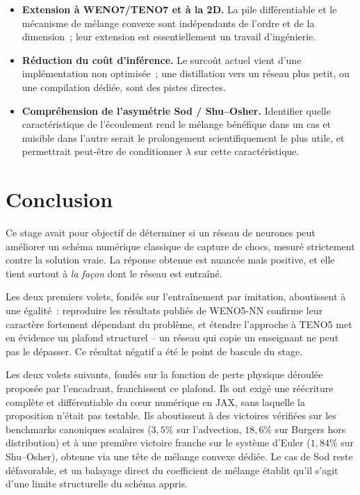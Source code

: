 \documentclass[12pt,a4paper,oneside]{report}
\begin{document}
\begin{itemize}
  \item \textbf{Extension à WENO7/TENO7 et à la 2D.} La pile différentiable et
  le mécanisme de mélange convexe sont indépendants de l'ordre et de la
  dimension~; leur extension est essentiellement un travail d'ingénierie.
  \item \textbf{Réduction du coût d'inférence.} Le surcoût actuel vient d'une
  implémentation non optimisée~; une distillation vers un réseau plus petit, ou
  une compilation dédiée, sont des pistes directes.
  \item \textbf{Compréhension de l'asymétrie Sod / Shu--Osher.} Identifier
  quelle caractéristique de l'écoulement rend le mélange bénéfique dans un cas
  et nuisible dans l'autre serait le prolongement scientifiquement le plus
  utile, et permettrait peut-être de conditionner $\lambda$ sur cette
  caractéristique.
\end{itemize}

\chapter*{Conclusion}

Ce stage avait pour objectif de déterminer si un réseau de neurones peut
améliorer un schéma numérique classique de capture de chocs, mesuré strictement
contre la solution vraie. La réponse obtenue est nuancée mais positive, et elle
tient surtout à \emph{la façon} dont le réseau est entraîné.

Les deux premiers volets, fondés sur l'entraînement par imitation, aboutissent à
une égalité~: reproduire les résultats publiés de WENO5-NN confirme leur
caractère fortement dépendant du problème, et étendre l'approche à TENO5 met en
évidence un plafond structurel -- un réseau qui copie un enseignant ne peut pas
le dépasser. Ce résultat négatif a été le point de bascule du stage.

Les deux volets suivants, fondés sur la fonction de perte physique déroulée
proposée par l'encadrant, franchissent ce plafond. Ils ont exigé une réécriture
complète et différentiable du cœur numérique en JAX, sans laquelle la
proposition n'était pas testable. Ils aboutissent à des victoires vérifiées sur
les benchmarks canoniques scalaires ($3{,}5\%$ sur l'advection, $18{,}6\%$ sur
Burgers hors distribution) et à une première victoire franche sur le système
d'Euler ($1{,}84\%$ sur Shu--Osher), obtenue via une tête de mélange convexe
dédiée. Le cas de Sod reste défavorable, et un balayage direct du coefficient de
mélange établit qu'il s'agit d'une limite structurelle du schéma appris.
\end{document}
